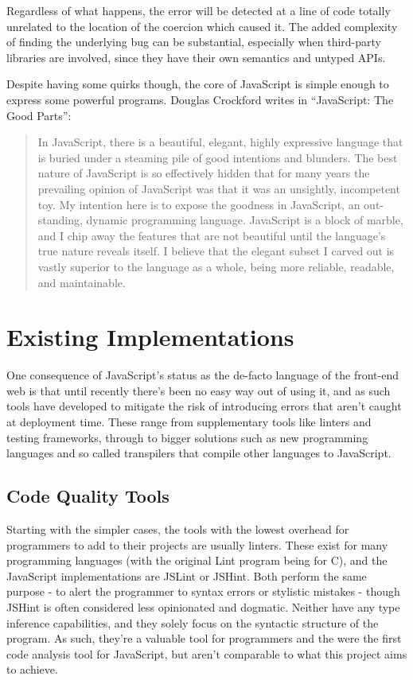 \documentclass[british, twoside]{bhamthesis}
\theoremstyle{definition}
\begin{document}
    Regardless of what happens, the error will be detected at a line of code totally unrelated to the location of the coercion which caused it. The added complexity of finding the underlying bug can be substantial, especially when third-party libraries are involved, since they have their own semantics and untyped APIs.

    Despite having some quirks though, the core of JavaScript is simple enough to express some powerful programs. Douglas Crockford writes in “JavaScript: The Good Parts”:

    \begin{quote}
      In JavaScript, there is a beautiful, elegant, highly expressive language that is buried under a steaming pile of good intentions and blunders. The best nature of JavaScript is so effectively hidden that for many years the prevailing opinion of JavaScript was that it was an unsightly, incompetent toy. My intention here is to expose the goodness in JavaScript, an out- standing, dynamic programming language. JavaScript is a block of marble, and I chip away the features that are not beautiful until the language’s true nature reveals itself. I believe that the elegant subset I carved out is vastly superior to the language as a whole, being more reliable, readable, and maintainable.
    \end{quote}
    \autocite{Crockford2008}

  \section{Existing Implementations}
    One consequence of JavaScript's status as the de-facto language of the front-end web is that until recently there's been no easy way out of using it, and as such tools have developed to mitigate the risk of introducing errors that aren't caught at deployment time. These range from supplementary tools like linters and testing frameworks, through to bigger solutions such as new programming languages and so called transpilers that compile other languages to JavaScript.

  \subsection{Code Quality Tools}

    Starting with the simpler cases, the tools with the lowest overhead for programmers to add to their projects are usually linters. These exist for many programming languages (with the original Lint program being for C), and the JavaScript implementations are JSLint or JSHint. Both perform the same purpose - to alert the programmer to syntax errors or stylistic mistakes - though JSHint is often considered less opinionated and dogmatic. Neither have any type inference capabilities, and they solely focus on the syntactic structure of the program. As such, they're a valuable tool for programmers and the were the first code analysis tool for JavaScript, but aren't comparable to what this project aims to achieve.
\end{document}
